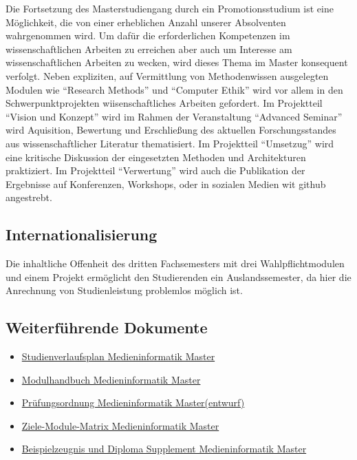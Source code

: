 Die Fortsetzung des Masterstudiengang durch ein Promotionsstudium ist
eine Möglichkeit, die von einer erheblichen Anzahl unserer Absolventen
wahrgenommen wird. Um dafür die erforderlichen Kompetenzen im
wissenschaftlichen Arbeiten zu erreichen aber auch um Interesse am
wissenschaftlichen Arbeiten zu wecken, wird dieses Thema im Master
konsequent verfolgt. Neben expliziten, auf Vermittlung von
Methodenwissen ausgelegten Modulen wie ``Research Methods'' und
``Computer Ethik'' wird vor allem in den Schwerpunktprojekten
wiisenschaftliches Arbeiten gefordert. Im Projektteil ``Vision und
Konzept'' wird im Rahmen der Veranstaltung ``Advanced Seminar'' wird
Aquisition, Bewertung und Erschließung des aktuellen Forschungsstandes
aus wissenschaftlicher Literatur thematisiert. Im Projektteil
``Umsetzug'' wird eine kritische Diskussion der eingesetzten Methoden
und Architekturen praktiziert. Im Projektteil ``Verwertung'' wird auch
die Publikation der Ergebnisse auf Konferenzen, Workshops, oder in
sozialen Medien wit github angestrebt.

\subsection{Internationalisierung}\label{internationalisierung}

Die inhaltliche Offenheit des dritten Fachsemesters mit drei
Wahlpflichtmodulen und einem Projekt ermöglicht den Studierenden ein
Auslandssemester, da hier die Anrechnung von Studienleistung problemlos
möglich ist.

\subsection{Weiterführende
Dokumente}\label{weiterfuxfchrende-dokumente-4}

\begin{itemize}
\tightlist
\item
  \href{https://th-koeln.github.io/mi-2017/anhaenge/ma-studienverlaufsplaene.pdf}{Studienverlaufsplan
  Medieninformatik Master}
\item
  \href{https://th-koeln.github.io/mi-2017/anhaenge/medieninformatik-master-modulhandbuch.pdf}{Modulhandbuch
  Medieninformatik Master}
\item
  \href{https://th-koeln.github.io/mi-2017/anhaenge/ma-MIMPO_Entwurf_20170218.pdf}{Prüfungsordnung
  Medieninformatik Master(entwurf)}
\item
  \href{https://th-koeln.github.io/mi-2017/anhaenge/ma-Ziele-Module-Matrix-Medieninformatik-Master.pdf}{Ziele-Module-Matrix
  Medieninformatik Master}
\item
  \href{https://th-koeln.github.io/mi-2017/anhaenge/ma-zeugnis.pdf}{Beispielzeugnis und Diploma
  Supplement Medieninformatik Master}
\end{itemize}

